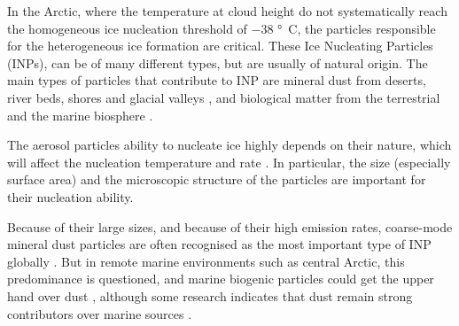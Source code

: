In the Arctic, where the temperature at cloud height do not systematically reach the homogeneous ice nucleation threshold of $-38$ \unit{\degree C}, the particles responsible for the heterogeneous ice formation are critical. These Ice Nucleating Particles (INPs), can be of many different types, but are usually of natural origin. 
The main types of particles that contribute to INP are mineral dust from deserts, river beds, shores and glacial valleys \citep{meinander_newly_2022}, and biological matter from the terrestrial and the marine biosphere \citep{cornwell_bioaerosols_2023}. 

The aerosol particles ability to nucleate ice highly depends on their nature, which will affect the nucleation temperature and rate \citep{murray_ice_2012, hoose_heterogeneous_2012, kanji_overview_2017}.
In particular, the size (especially surface area) and the microscopic structure of the particles are important for their nucleation ability.

Because of their large sizes, and because of their high emission rates, coarse-mode mineral dust particles are often recognised as the most important type of INP globally \citep[][]{kok_mineral_2023}. 
But in remote marine environments such as central Arctic, this predominance is questioned, and marine biogenic particles could get the upper hand over dust \citep{burrows_ice_2013}, although some research indicates that dust remain strong contributors over marine sources \citep[][]{si_concentrations_2019}.


